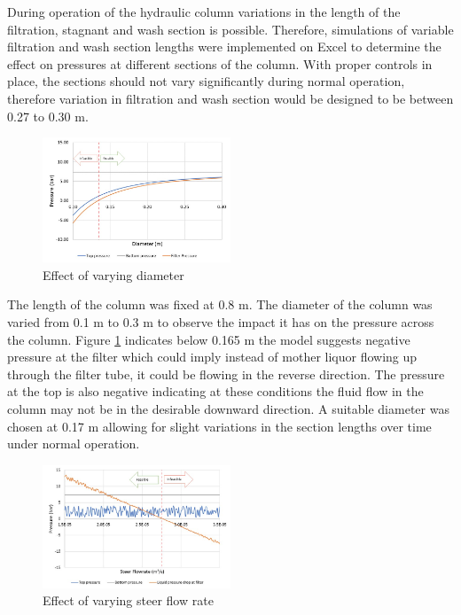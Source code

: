 During operation of the hydraulic column  variations in the length of the filtration, stagnant and wash section is possible. Therefore, simulations of variable filtration and wash section lengths were implemented on Excel to determine the effect on pressures at different sections of the column. With proper controls in place, the sections should not vary significantly during normal operation, therefore variation in filtration and wash section would be designed to be between 0.27 to 0.30 m.  

\begin{figure}
\centering
\includegraphics[width=0.5\textwidth]{chapters/3-separation/figures/diameter.jpg}
\caption{ Effect of varying diameter}
\label{fig:dia_col}
\end{figure}

The length of the column was fixed at 0.8 m. The diameter of the column was varied from 0.1 m to 0.3 m to observe the impact it has on the pressure across the column. Figure \ref{fig:dia_col} indicates below 0.165 m the model suggests negative pressure at the filter which could imply instead of mother liquor flowing up through the filter tube, it could be flowing in the reverse direction. The pressure at the top is also negative indicating at these conditions the fluid flow in the column may not be in the desirable downward direction. A suitable diameter was chosen at 0.17 m allowing for slight variations in the section lengths over time under normal operation.

\begin{figure}
\centering
\includegraphics[width=0.5\textwidth]{chapters/3-separation/figures/steerflow.jpg}
\caption{ Effect of varying steer flow rate}
\label{fig:steer_col}
\end{figure}

